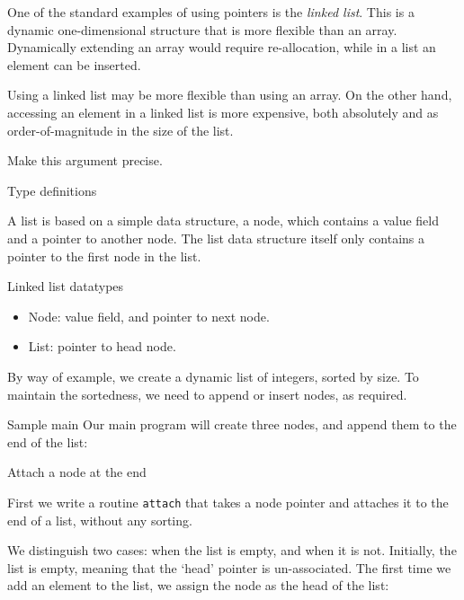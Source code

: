 One of the standard examples of using pointers is the
\emph{linked list}. This is a dynamic one-dimensional structure
that is more flexible than an array. Dynamically extending an array
would require re-allocation, while in a list an element can be
inserted.

\begin{exercise}
  Using a linked list may be more flexible than using an array.
  On the other hand, accessing an element in a linked list is
  more expensive, both absolutely and as order-of-magnitude in the size
  of the list.

  Make this argument precise.
\end{exercise}

 {Type definitions}

A list is based on a simple data structure, a node, which contains a
value field and a pointer to another node.
The list data structure itself only contains a pointer to the first node
in the list.

\begin{block}{Linked list datatypes}
  \label{sl:flinktypes}
  \begin{itemize}
  \item Node: value field, and pointer to next node.
  \item List: pointer to head node.
  \end{itemize}
\end{block}

By way of example, we create a dynamic list of integers, sorted by
size.
To maintain the sortedness, we need to append or insert nodes,
as required.

\begin{block}{Sample main}
  \label{sl:flinkmain}
  Our main program will create three nodes,
  and append them to the end of the list:
\end{block}

 {Attach a node at the end}

First we write a routine \lstinline{attach} that takes
a node pointer and attaches it to the end of a list,
without any sorting.


We distinguish two cases: when the list is empty,
and when it is not.
Initially, the list is empty, meaning that the `head' pointer is
un-associated.
The first time we add an element to the list,
we assign the node as the head of the list:
%

